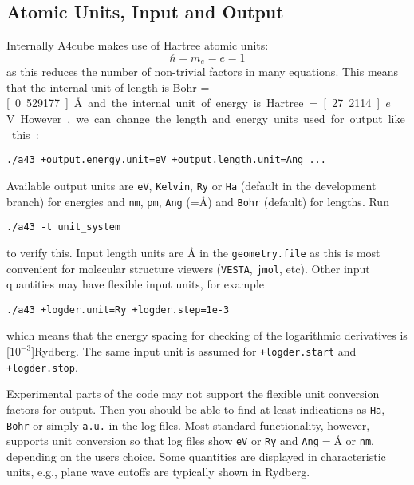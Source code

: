 \documentclass[oribibl]{llncs}
\newcommand{\ttt}[1]{\texttt{#1}}
\newcommand{\codename}{A4cube}
\begin{document}
\subsection{Atomic Units, Input and Output} \label{sec:units}
%
Internally \codename{} makes use of Hartree atomic units:
\begin{equation}
	\hbar = m_e = e = 1
\end{equation}
as this reduces the number of non-trivial factors in many equations.
This means that the internal unit of length is Bohr = \unit[0.529177]{\AA{}}
and the internal unit of energy is Hartree = \unit[27.2114]{$e$V}.
However, we can change the length and energy units used for output like this:
\begin{verbatim}
./a43 +output.energy.unit=eV +output.length.unit=Ang ...
\end{verbatim}
Available output units are \ttt{eV}, \ttt{Kelvin}, \ttt{Ry} or \ttt{Ha} (default in the development branch) for energies 
and \ttt{nm}, \ttt{pm}, \ttt{Ang} (=\AA) and \ttt{Bohr} (default) for lengths. Run
\begin{verbatim}
./a43 -t unit_system
\end{verbatim}
to verify this.
%
Input length units are \AA{} in the \ttt{geometry.file} as this is most convenient for molecular structure viewers
(\ttt{VESTA}, \ttt{jmol}, etc). Other input quantities may have flexible input units, for example
\begin{verbatim}
./a43 +logder.unit=Ry +logder.step=1e-3
\end{verbatim}
which means that the energy spacing for checking of the logarithmic derivatives is \unit[$10^{-3}$]{Rydberg}.
The same input unit is assumed for \ttt{+logder.start} and \ttt{+logder.stop}.


Experimental parts of the code may not support the flexible unit conversion
factors for output. Then you should be able to find at least indications as \ttt{Ha}, \ttt{Bohr} or simply \ttt{a.u.} in the log files.
Most standard functionality, however, supports unit conversion so that log files
show \ttt{eV} or \ttt{Ry} and \ttt{Ang}$ = $\AA{} or \ttt{nm}, depending on the users choice.
Some quantities are displayed in characteristic units, e.g., plane wave cutoffs are typically shown in Rydberg.
\end{document}
